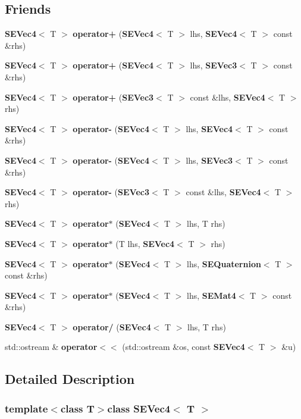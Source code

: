 \subsection*{Friends}
\begin{DoxyCompactItemize}
\item 
{\bf S\+E\+Vec4}$<$ T $>$ {\bf operator+} ({\bf S\+E\+Vec4}$<$ T $>$ lhs, {\bf S\+E\+Vec4}$<$ T $>$ const \&rhs)
\item 
{\bf S\+E\+Vec4}$<$ T $>$ {\bf operator+} ({\bf S\+E\+Vec4}$<$ T $>$ lhs, {\bf S\+E\+Vec3}$<$ T $>$ const \&rhs)
\item 
{\bf S\+E\+Vec4}$<$ T $>$ {\bf operator+} ({\bf S\+E\+Vec3}$<$ T $>$ const \&lhs, {\bf S\+E\+Vec4}$<$ T $>$ rhs)
\item 
{\bf S\+E\+Vec4}$<$ T $>$ {\bf operator-\/} ({\bf S\+E\+Vec4}$<$ T $>$ lhs, {\bf S\+E\+Vec4}$<$ T $>$ const \&rhs)
\item 
{\bf S\+E\+Vec4}$<$ T $>$ {\bf operator-\/} ({\bf S\+E\+Vec4}$<$ T $>$ lhs, {\bf S\+E\+Vec3}$<$ T $>$ const \&rhs)
\item 
{\bf S\+E\+Vec4}$<$ T $>$ {\bf operator-\/} ({\bf S\+E\+Vec3}$<$ T $>$ const \&lhs, {\bf S\+E\+Vec4}$<$ T $>$ rhs)
\item 
{\bf S\+E\+Vec4}$<$ T $>$ {\bf operator$\ast$} ({\bf S\+E\+Vec4}$<$ T $>$ lhs, T rhs)
\item 
{\bf S\+E\+Vec4}$<$ T $>$ {\bf operator$\ast$} (T lhs, {\bf S\+E\+Vec4}$<$ T $>$ rhs)
\item 
{\bf S\+E\+Vec4}$<$ T $>$ {\bf operator$\ast$} ({\bf S\+E\+Vec4}$<$ T $>$ lhs, {\bf S\+E\+Quaternion}$<$ T $>$ const \&rhs)
\item 
{\bf S\+E\+Vec4}$<$ T $>$ {\bf operator$\ast$} ({\bf S\+E\+Vec4}$<$ T $>$ lhs, {\bf S\+E\+Mat4}$<$ T $>$ const \&rhs)
\item 
{\bf S\+E\+Vec4}$<$ T $>$ {\bf operator/} ({\bf S\+E\+Vec4}$<$ T $>$ lhs, T rhs)
\item 
std\+::ostream \& {\bf operator$<$$<$} (std\+::ostream \&os, const {\bf S\+E\+Vec4}$<$ T $>$ \&u)
\end{DoxyCompactItemize}


\subsection{Detailed Description}
\subsubsection*{template$<$class T$>$class S\+E\+Vec4$<$ T $>$}




